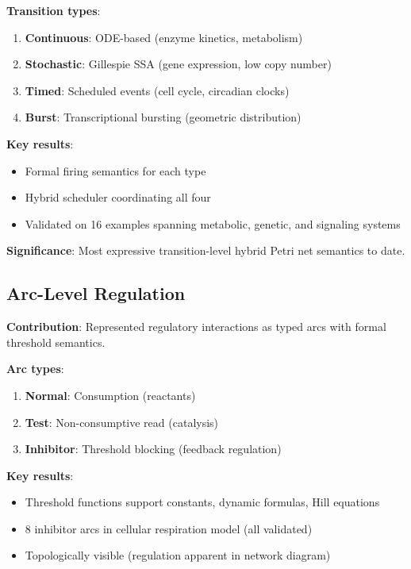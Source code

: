 \textbf{Transition types}:
\begin{enumerate}
    \item \textbf{Continuous}: ODE-based (enzyme kinetics, metabolism)
    \item \textbf{Stochastic}: Gillespie SSA (gene expression, low copy number)
    \item \textbf{Timed}: Scheduled events (cell cycle, circadian clocks)
    \item \textbf{Burst}: Transcriptional bursting (geometric distribution)
\end{enumerate}

\textbf{Key results}:
\begin{itemize}
    \item Formal firing semantics for each type
    \item Hybrid scheduler coordinating all four
    \item Validated on 16 examples spanning metabolic, genetic, and signaling systems
\end{itemize}

\textbf{Significance}: Most expressive transition-level hybrid Petri net semantics to date.

\subsection{Arc-Level Regulation}
\label{subsec:arc-summary}

\textbf{Contribution}: Represented regulatory interactions as typed arcs with formal threshold semantics.

\textbf{Arc types}:
\begin{enumerate}
    \item \textbf{Normal}: Consumption (reactants)
    \item \textbf{Test}: Non-consumptive read (catalysis)
    \item \textbf{Inhibitor}: Threshold blocking (feedback regulation)
\end{enumerate}

\textbf{Key results}:
\begin{itemize}
    \item Threshold functions support constants, dynamic formulas, Hill equations
    \item 8 inhibitor arcs in cellular respiration model (all validated)
    \item Topologically visible (regulation apparent in network diagram)
\end{itemize}

